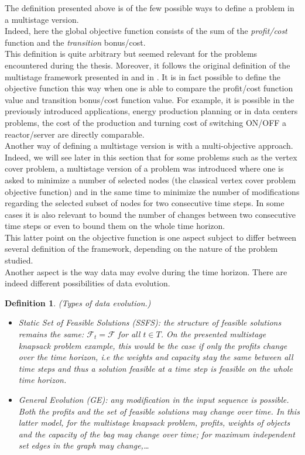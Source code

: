 \documentclass[a4paper]{book}
\newtheorem{definition}{Definition}
\begin{document}
The definition presented above is of the few possible ways to define a problem in a multistage version.\\

Indeed, here the global objective function consists of the sum of the \textit{profit/cost} function and the \textit{transition} bonus/cost.\\ This definition is quite arbitrary but seemed relevant for the problems encountered during the thesis. Moreover, it follows the original definition of the multistage framework presented in \cite{Gupta} and in \cite{Eisenstat}. It is in fact possible to define the objective function this way when one is able to compare the profit/cost function value and transition bonus/cost function value. For example, it is possible in the previously introduced applications, energy production planning or in data centers problems, the cost of the production  and turning cost of switching ON/OFF a reactor/server are directly comparable.\\
Another way of defining a multistage version is with a multi-objective approach. Indeed, we will see later in this section that for some problems such as the {\sc vertex cover} problem, a multistage version of a problem was introduced where  
one is asked to minimize a number of selected nodes (the classical {\sc vertex cover} problem objective function) and in the same time to minimize the number of modifications regarding the selected subset of nodes for two consecutive time steps. In some cases it is also relevant to bound the number of changes between two consecutive time steps or even to bound them on the whole time horizon. \\

This latter point on the objective function is one aspect subject to differ between several definition of the framework, depending on the nature of the problem studied. \\
Another aspect is the way data may evolve during the time horizon. There are indeed different possibilities of data evolution.
\begin{definition}
\emph{(Types of data evolution.)}
\begin{itemize}
\item \emph{Static Set of Feasible Solutions (SSFS):}  the structure of feasible solutions remains the same: $\mathcal{F}_t=\mathcal{F}$ for all $t \in T$. On the presented {\sc multistage knapsack} problem example, this would be the case if only the profits change over the time horizon, i.e the weights and capacity stay the same between all time steps and thus a solution feasible at a time step is feasible on the whole time horizon.

\item \emph{General Evolution (GE):}  any modification in the input sequence is possible. Both the profits and the set of feasible solutions may change over time. In this latter model, for the {\sc multistage knapsack problem}, profits, weights of objects and the capacity of the bag may change over time; for maximum independent set edges in the graph may change,\dots   
\end{itemize}
\end{definition}
\end{document}
